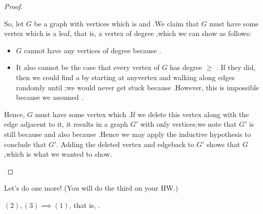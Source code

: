 \documentclass{tufte-handout}
\begin{document}
\begin{proof}
\begin{itemize}
    So, let $G$ be a graph with \blank vertices which is\linebreak
    \mbox{}\blank and \blank.\linebreak  We claim that $G$
    must have some vertex which is a leaf, that is, a vertex of degree
    \blank,\newline which we can show as follows:
    \begin{itemize}
    \item $G$ cannot have any vertices of degree \blank\linebreak because
      \blank.
    \item It also cannot be the case that every vertex of $G$ has
      degree $\geq$ \blank.  If they did, then we could find a \blank
      by starting at any\linebreak vertex and walking along edges
      randomly until \blank;\linebreak we would never get stuck
      because \blank.\linebreak However, this is impossible because we
      assumed \blank.
    \end{itemize}
    Hence, $G$ must have some vertex which \blank.\linebreak If we
    delete this vertex along with the edge adjacent to it, it results
    in a graph $G'$ with only \blank vertices;\linebreak we note that
    $G'$ is still \blank\linebreak because \blank\linebreak and also
    \blank\linebreak because \blank.\linebreak  Hence we may apply the
    inductive hypothesis to conclude that $G'$\linebreak \mbox{}\blank.
    Adding the deleted vertex and edge\linebreak back to $G'$ shows that $G$
    \blank,\linebreak which is what we wanted to show.
  \end{itemize}
\end{proof}

Let's do one more!  (You will do the third on your HW.)

\begin{lem}
  $(2),(3) \implies (1)$, that is, \blank\linebreak \mbox{}\blank.
\end{lem}
\end{document}
